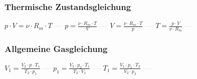 \subsubsection{Thermische Zustandsgleichung} 
\begin{minipage}{0.45\textwidth} 
\end{minipage} 
\begin{minipage}{0.45\textwidth} 
 
\end{minipage} 
$ p\cdot V =\nu \cdot R_{m} \cdot T $ \textcolor{lightgray}{\textbf{---}} 
$ p =\frac{\nu \cdot R_{m} \cdot T}{  V} $ \textcolor{lightgray}{\textbf{---}} 
$ V =\frac{\nu \cdot R_{m} \cdot T}{  p} $ \textcolor{lightgray}{\textbf{---}} 
$ T =\frac{p\cdot V}{\nu \cdot R_{m} } $ \textcolor{lightgray}{\textbf{---}} 

\subsubsection{Allgemeine Gasgleichung} 
\begin{minipage}{0.45\textwidth} 
\end{minipage} 
\begin{minipage}{0.45\textwidth} 
 
\end{minipage} 
$ V_{1}  = \frac{V_{2} \cdot p_{} \cdot T_{1} }{  T_{2} \cdot p_{1} } $ \textcolor{lightgray}{\textbf{---}} 
$ p_{1}  = \frac{V_{2} \cdot p_{2} \cdot T_{1} }{  T_{2} \cdot V_{1} } $ \textcolor{lightgray}{\textbf{---}} 
$ T_{1}  = \frac{V_{1} \cdot p_{1} \cdot T_{2} }{  V_{2} \cdot p_{2} } $ \textcolor{lightgray}{\textbf{---}} 

